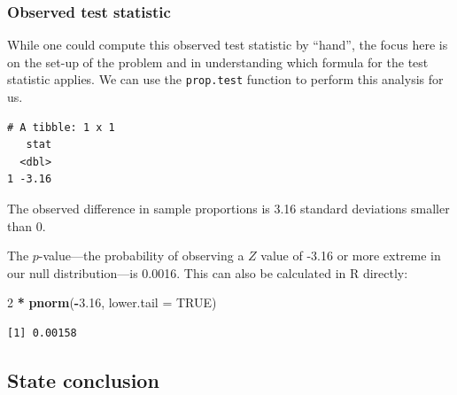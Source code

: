 \documentclass[12pt,]{krantz}
\makeatletter
\newenvironment{Shaded}{\begin{snugshade}}{\end{snugshade}}
\newcommand{\KeywordTok}[1]{\textcolor[rgb]{0.27,0.27,0.27}{\textbf{#1}}}
\newcommand{\DataTypeTok}[1]{\textcolor[rgb]{0.27,0.27,0.27}{#1}}
\newcommand{\DecValTok}[1]{\textcolor[rgb]{0.06,0.06,0.06}{#1}}
\newcommand{\FloatTok}[1]{\textcolor[rgb]{0.06,0.06,0.06}{#1}}
\newcommand{\StringTok}[1]{\textcolor[rgb]{0.5,0.5,0.5}{#1}}
\newcommand{\OtherTok}[1]{\textcolor[rgb]{0.37,0.37,0.37}{#1}}
\newcommand{\OperatorTok}[1]{\textcolor[rgb]{0.43,0.43,0.43}{\textbf{#1}}}
\newcommand{\NormalTok}[1]{#1}
\newenvironment{kframe}{%
\medskip{}
\setlength{\fboxsep}{.8em}
 \def\at@end@of@kframe{}%
 \ifinner\ifhmode%
  \def\at@end@of@kframe{\end{minipage}}%
  \begin{minipage}{\columnwidth}%
 \fi\fi%
 \def\FrameCommand##1{\hskip\@totalleftmargin \hskip-\fboxsep
 \colorbox{shadecolor}{##1}\hskip-\fboxsep
     \hskip-\linewidth \hskip-\@totalleftmargin \hskip\columnwidth}%
 \MakeFramed {\advance\hsize-\width
   \@totalleftmargin\z@ \linewidth\hsize
   \@setminipage}}%
 {\par\unskip\endMakeFramed%
 \at@end@of@kframe}
\renewenvironment{Shaded}{\begin{kframe}}{\end{kframe}}
\makeatother
\begin{document}
\subsubsection*{Observed test
statistic}\label{observed-test-statistic-2}


While one could compute this observed test statistic by ``hand'', the
focus here is on the set-up of the problem and in understanding which
formula for the test statistic applies. We can use the
\texttt{prop.test} function to perform this analysis for us.

\begin{Shaded}
\end{Shaded}

\begin{verbatim}
# A tibble: 1 x 1
   stat
  <dbl>
1 -3.16
\end{verbatim}

The observed difference in sample proportions is 3.16 standard
deviations smaller than 0.

The \(p\)-value---the probability of observing a \(Z\) value of -3.16 or
more extreme in our null distribution---is 0.0016. This can also be
calculated in R directly:

\begin{Shaded}
\begin{Highlighting}[]
\DecValTok{2} \OperatorTok{*}\StringTok{ }\KeywordTok{pnorm}\NormalTok{(}\OperatorTok{-}\FloatTok{3.16}\NormalTok{, }\DataTypeTok{lower.tail =} \OtherTok{TRUE}\NormalTok{)}
\end{Highlighting}
\end{Shaded}

\begin{verbatim}
[1] 0.00158
\end{verbatim}

\subsection{State conclusion}\label{state-conclusion-2}
\end{document}

